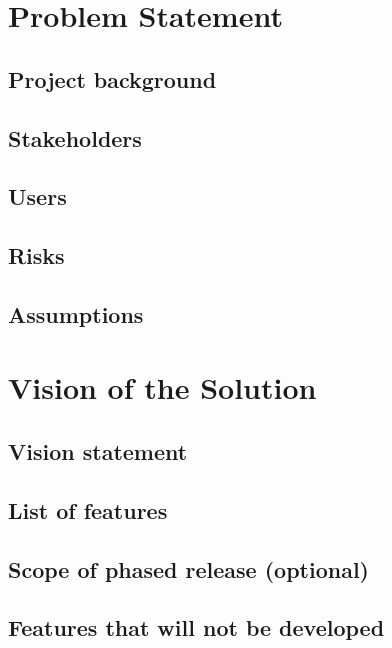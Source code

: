 \documentclass{article}
\begin{document}

\section{Problem Statement}
\subsection{Project background}
\subsection{Stakeholders}
\subsection{Users}
\subsection{Risks}
\subsection{Assumptions}
\section{Vision of the Solution}
\subsection{Vision statement}
\subsection{List of features}
\subsection{Scope of phased release (optional)}
\subsection{Features that will not be developed}
\end{document}

